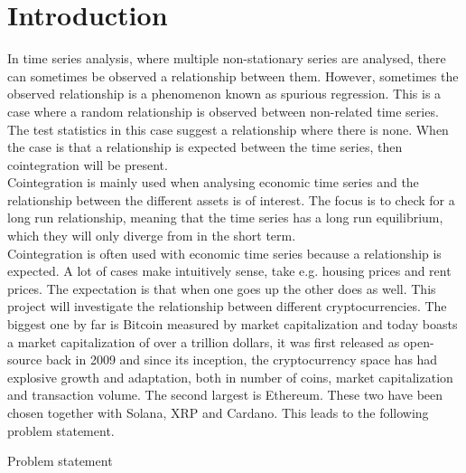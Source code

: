 \noindent
\chapter*{Introduction}
\label{Introduction}

In time series analysis, where multiple non-stationary series are analysed, there can sometimes be observed a relationship between them. However, sometimes the observed relationship is a phenomenon known as spurious regression. This is a case where a random relationship is observed between non-related time series. The test statistics in this case suggest a relationship where there is none. When the case is that a relationship is expected between the time series, then cointegration will be present.\\
Cointegration is mainly used when analysing economic time series and the relationship between the different assets is of interest. The focus is to check for a long run relationship, meaning that the time series has a long run equilibrium, which they will only diverge from in the short term.\\

\noindent Cointegration is often used with economic time series because a relationship is expected. A lot of cases make intuitively sense, take e.g. housing prices and rent prices. The expectation is that when one goes up the other does as well. This project will investigate the relationship between different cryptocurrencies. The biggest one by far is Bitcoin measured by market capitalization and today boasts a market capitalization of over a trillion dollars, it was first released as open-source back in 2009 and since its inception, the cryptocurrency space has had explosive growth and adaptation, both in number of coins, market capitalization and transaction volume. The second largest is Ethereum. These two have been chosen together with Solana, XRP and Cardano. This leads to the following problem statement.

\begin{note}Problem statement
    
\end{note}